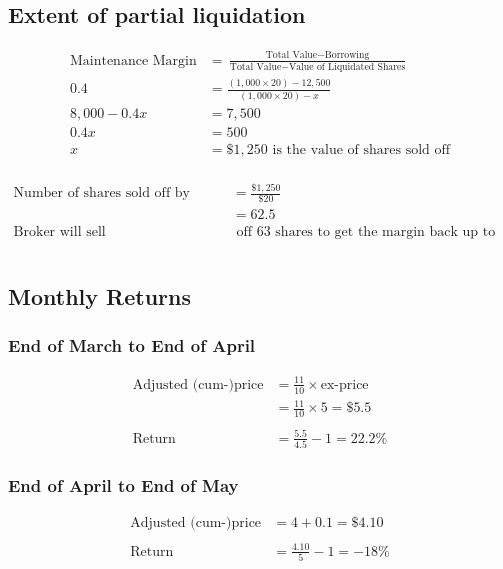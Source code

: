 \documentclass[12pt]{article}
\begin{document}
\subsection{Extent of partial liquidation}
\begin{align*}
	\text{Maintenance Margin} &=  \frac{\text{Total Value} - \text{Borrowing}}{\text{Total Value} - \text{Value of Liquidated Shares}} \\
	0.4 &= \frac{(1,000\times20) - 12,500}{(1,000\times20)-x} \\
	8,000 - 0.4x &= 7,500\\
	0.4x &= 500\\
	x &= \$1,250 \text{ is the value of shares sold off}\\
\end{align*}

\begin{flushleft}
\end{flushleft}

\begin{align*}
	\text{Number of shares sold off by broker} &= \frac{\$1,250}{\$20}\\
	&= 62.5\\
	\text{Broker will sell} &\text{ off 63 shares to get the margin back up to 40\%}
\end{align*}

\section{}
\subsection{Monthly Returns}
\subsubsection{End of March to End of April}
\begin{align*}
	\text{Adjusted (cum-)price} &= \frac{11}{10}\times\text{ex-price}\\
	&= \frac{11}{10}\times5 = \$5.5\\
	&\\
	\text{Return} &= \frac{5.5}{4.5}-1 = 22.2\%
\end{align*}

\subsubsection{End of April to End of May}
\begin{align*}
	\text{Adjusted (cum-)price} &= 4 + 0.1 = \$4.10\\
	&\\
	\text{Return} &= \frac{4.10}{5}-1 = -18\%
\end{align*}
\end{document}
